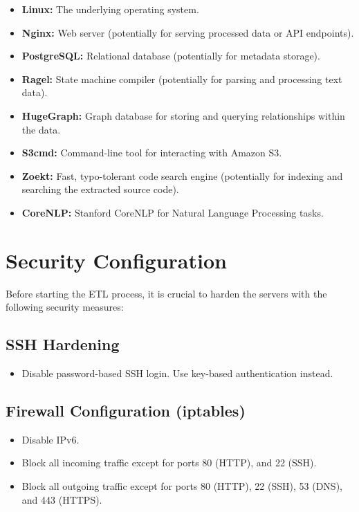 \documentclass{article}
\begin{document}
\begin{itemize}
    \item \textbf{Linux:} The underlying operating system.
    \item \textbf{Nginx:} Web server (potentially for serving processed data or API endpoints).
    \item \textbf{PostgreSQL:} Relational database (potentially for metadata storage).
    \item \textbf{Ragel:} State machine compiler (potentially for parsing and processing text data).
    \item \textbf{HugeGraph:} Graph database for storing and querying relationships within the data.
    \item \textbf{S3cmd:} Command-line tool for interacting with Amazon S3.
    \item \textbf{Zoekt:} Fast, typo-tolerant code search engine (potentially for indexing and searching the extracted source code).
    \item \textbf{CoreNLP:} Stanford CoreNLP for Natural Language Processing tasks.
\end{itemize}

\section{Security Configuration}

Before starting the ETL process, it is crucial to harden the servers with the following security measures:

\subsection{SSH Hardening}

\begin{itemize}
    \item Disable password-based SSH login.  Use key-based authentication instead.
\end{itemize}

\subsection{Firewall Configuration (iptables)}

\begin{itemize}
    \item Disable IPv6.
    \item Block all incoming traffic except for ports 80 (HTTP), and 22 (SSH).
    \item Block all outgoing traffic except for ports 80 (HTTP), 22 (SSH), 53 (DNS), and 443 (HTTPS).
\end{itemize}
\end{document}
